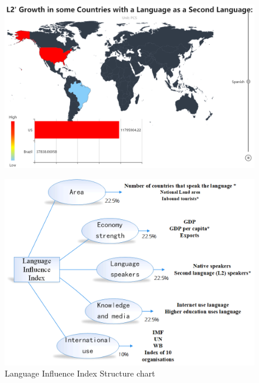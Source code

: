 \begin{figure}[h]
	\centering
	\includegraphics[width=1\linewidth]{figures/Spanish}
	\caption{}
	\label{fig:spanish}
\end{figure}



\begin{figure}
	\centering
	\includegraphics[width=1\linewidth]{figures/chart}
	\caption{Language Influence Index Structure chart}
	\label{fig:chart}
\end{figure}

